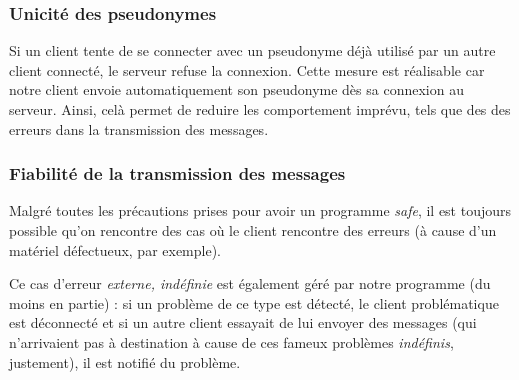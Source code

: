 \documentclass{article}
\begin{document}
\subsubsection{Unicité des pseudonymes}

 Si un client tente de se connecter avec un pseudonyme déjà utilisé par un autre client connecté, le serveur refuse la connexion. Cette mesure est réalisable car notre client envoie automatiquement son pseudonyme dès sa connexion au serveur. Ainsi, celà permet de reduire les comportement imprévu, tels que des des erreurs dans la transmission des messages.

\subsubsection{Fiabilité de la transmission des messages}

Malgré toutes les précautions prises pour avoir un programme \textit{safe}, il est toujours possible qu'on rencontre des cas où le client rencontre des erreurs (à cause d'un matériel défectueux, par exemple). 

Ce cas d'erreur \textit{externe, indéfinie} est également géré par notre programme (du moins en partie) : si un problème de ce type est détecté, le client problématique est déconnecté et si un autre client essayait de lui envoyer des messages (qui n'arrivaient pas à destination à cause de ces fameux problèmes \textit{indéfinis}, justement), il est notifié du problème.
\end{document}
